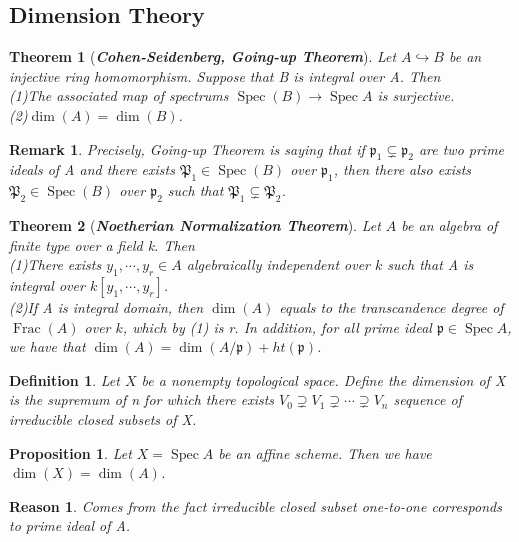 \documentclass{ctexart}
\newtheorem{definition}{Definition}[section]
\newtheorem{remark}{Remark}[section]
\newtheorem{theorem}{Theorem}[section]
\newtheorem{proposition}{Proposition}[section]
\newtheorem{reason}{Reason}[section]
\newcommand{\spec}{\operatorname{Spec}}
\newcommand{\fraction}{\operatorname{Frac}}
\begin{document}
\subsection{Dimension Theory}
\begin{theorem}[\textbf{\emph{Cohen-Seidenberg, Going-up Theorem}}]
    Let $A \hookrightarrow B$ be an injective ring homomorphism.
    Suppose that B is integral over A.
    Then \\
    (1)The associated map of spectrums $\spec(B) \longrightarrow \spec A$ is surjective. \\
    (2)$\dim(A) = \dim(B)$.
    \label{Theorem 3.3}
\end{theorem}
\begin{remark}
    Precisely, Going-up Theorem is saying that if $\mathfrak{p}_{1} \subsetneq \mathfrak{p}_{2}$ are two prime ideals of A and there exists $\mathfrak{P}_{1}\in \spec(B)$ over $\mathfrak{p}_{1}$,
    then there also exists $\mathfrak{P}_{2}\in \spec(B)$ over $\mathfrak{p}_{2}$ such that $\mathfrak{P}_{1} \subsetneq \mathfrak{P}_{2}$.
\end{remark}
\begin{theorem}[\textbf{\emph{Noetherian Normalization Theorem}}]
    Let $A$ be an algebra of finite type over a field k.
    Then \\
    (1)There exists $y_{1}, \cdots, y_{r}\in A$ algebraically independent over $k$ such that A is integral over $k[y_{1}, \cdots, y_{r}]$. \\
    (2)If A is integral domain, then $\dim(A)$ equals to the transcandence degree of $\fraction(A)$ over $k$, which by (1) is r.
    In addition, for all prime ideal $\mathfrak{p}\in \spec A$, we have that $\dim(A) = \dim(A/\mathfrak{p}) + ht(\mathfrak{p})$.
    \label{Theorem 3.4}
\end{theorem}
\begin{definition}
    Let $X$ be a nonempty topological space.
    Define the dimension of X is the supremum of n for which there exists $V_{0} \supsetneq V_{1} \supsetneq \cdots \supsetneq V_{n}$ sequence of irreducible closed subsets of X.
\end{definition}
\begin{proposition}
    Let $X = \spec A$ be an affine scheme.
    Then we have $\dim(X) = \dim(A)$.
    \label{Proposition 3.12}
\end{proposition}
\begin{reason}
    Comes from the fact irreducible closed subset one-to-one corresponds to prime ideal of A.
\end{reason}
\end{document}

